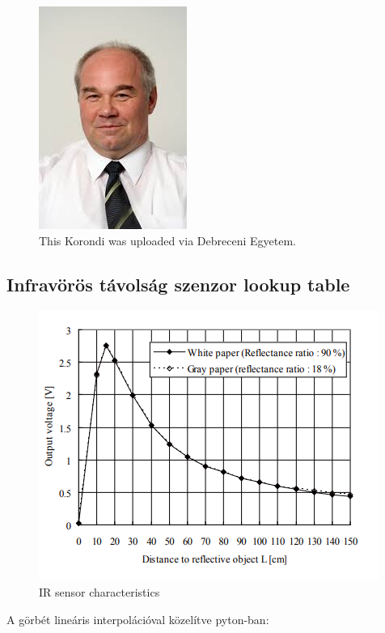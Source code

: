 \documentclass{article}
\begin{document}
\begin{figure}
\centering
\includegraphics[width=0.25\linewidth]{korondiP.jpg}
\caption{\label{fig:korondi}This Korondi was uploaded via Debreceni Egyetem.}
\end{figure}

\subsection{Infravörös távolság szenzor lookup table}
\begin{figure}[H]
    \centering
    \includegraphics[scale=0.7]{IR_distance_characteristics.png}
    \caption{\label{fig:korondi}IR sensor characteristics}
\end{figure}
A görbét lineáris interpolációval közelítve pyton-ban:
\end{document}
